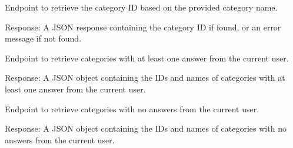\documentclass[letterpaper,10pt,english]{sphinxmanual}
\begin{document}

\begin{fulllineitems}
\label{\detokenize{routes.settings:routes.settings.routes.get_category_id}}
\pysigstartsignatures
{}
\pysigstopsignatures
\sphinxAtStartPar
Endpoint to retrieve the category ID based on the provided category name.
\begin{description}
\sphinxAtStartPar
Response: A JSON response containing the category ID if found, or an error message if not found.

\end{description}

\end{fulllineitems}


\begin{fulllineitems}
\label{\detokenize{routes.settings:routes.settings.routes.get_current_categories}}
\pysigstartsignatures
{}
\pysigstopsignatures
\sphinxAtStartPar
Endpoint to retrieve categories with at least one answer from the current user.
\begin{description}
\sphinxAtStartPar
Response: A JSON object containing the IDs and names of categories with at least one answer from the current user.

\end{description}

\end{fulllineitems}


\begin{fulllineitems}
\label{\detokenize{routes.settings:routes.settings.routes.get_empty_categories}}
\pysigstartsignatures
{}
\pysigstopsignatures
\sphinxAtStartPar
Endpoint to retrieve categories with no answers from the current user.
\begin{description}
\sphinxAtStartPar
Response: A JSON object containing the IDs and names of categories with no answers from the current user.

\end{description}

\end{fulllineitems}
\end{document}
